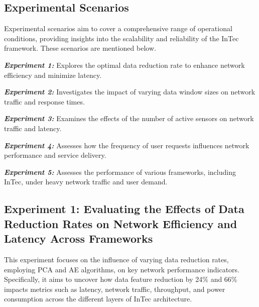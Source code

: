 \documentclass[11pt]{article}
\begin{document}
	\begin{table}[t]
		\centering
		\caption{Latency of Well-known Cloud Providers}
	\end{table}
	
	\subsection{Experimental Scenarios}
	Experimental scenarios aim to cover a comprehensive range of operational conditions, providing insights into the scalability and reliability of the InTec framework. These scenarios are mentioned below.
	
	\textbf{\textit{Experiment 1:}} Explores the optimal data reduction rate to enhance network efficiency and minimize latency.
	
	\textbf{\textit{Experiment 2:}} Investigates the impact of varying data window sizes on network traffic and response times.
	
	\textbf{\textit{Experiment 3:}} Examines the effects of the number of active sensors on network traffic and latency.
	
	\textbf{\textit{Experiment 4:}} Assesses how the frequency of user requests influences network performance and service delivery.
	
	\textbf{\textit{Experiment 5:}} Assesses the performance of various frameworks, including InTec, under heavy network traffic and user demand.
	
	\subsection{\textbf{Experiment 1:} Evaluating the Effects of Data Reduction Rates on Network Efficiency and Latency Across Frameworks}
	This experiment focuses on the influence of varying data reduction rates, employing PCA and AE algorithms, on key network performance indicators. Specifically, it aims to uncover how data feature reduction by 24\% and 66\% impacts metrics such as latency, network traffic, throughput, and power consumption across
	the different layers of InTec architecture.
	
\end{document}
